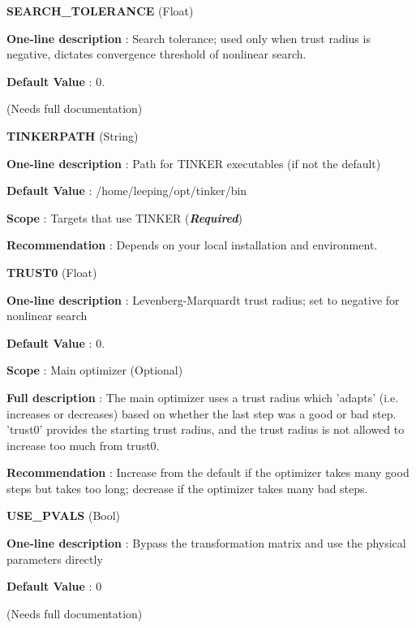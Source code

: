 \begin{DoxyItemize}
\item {\bfseries  \-S\-E\-A\-R\-C\-H\-\_\-\-T\-O\-L\-E\-R\-A\-N\-C\-E } (\-Float) \par
{\bfseries  \-One-\/line description }\-: \-Search tolerance; used only when trust radius is negative, dictates convergence threshold of nonlinear search. \par
{\bfseries  \-Default \-Value }\-: 0. \par
(\-Needs full documentation)\end{DoxyItemize}
\begin{DoxyItemize}
\item {\bfseries  \-T\-I\-N\-K\-E\-R\-P\-A\-T\-H } (\-String) \par
{\bfseries  \-One-\/line description }\-: \-Path for \-T\-I\-N\-K\-E\-R executables (if not the default) \par
{\bfseries  \-Default \-Value }\-: /home/leeping/opt/tinker/bin \par
{\bfseries  \-Scope }\-: \-Targets that use \-T\-I\-N\-K\-E\-R ({\bfseries {\itshape \-Required\/}}) \par
{\bfseries  \-Recommendation }\-: \-Depends on your local installation and environment.\end{DoxyItemize}
\begin{DoxyItemize}
\item {\bfseries  \-T\-R\-U\-S\-T0 } (\-Float) \par
{\bfseries  \-One-\/line description }\-: \-Levenberg-\/\-Marquardt trust radius; set to negative for nonlinear search \par
{\bfseries  \-Default \-Value }\-: 0. \par
{\bfseries  \-Scope }\-: \-Main optimizer (\-Optional) \par
{\bfseries  \-Full description }\-: \-The main optimizer uses a trust radius which 'adapts' (i.\-e. increases or decreases) based on whether the last step was a good or bad step. 'trust0' provides the starting trust radius, and the trust radius is not allowed to increase too much from trust0. \par
{\bfseries  \-Recommendation }\-: \-Increase from the default if the optimizer takes many good steps but takes too long; decrease if the optimizer takes many bad steps.\end{DoxyItemize}
\begin{DoxyItemize}
\item {\bfseries  \-U\-S\-E\-\_\-\-P\-V\-A\-L\-S } (\-Bool) \par
{\bfseries  \-One-\/line description }\-: \-Bypass the transformation matrix and use the physical parameters directly \par
{\bfseries  \-Default \-Value }\-: 0 \par
(\-Needs full documentation)\end{DoxyItemize}
